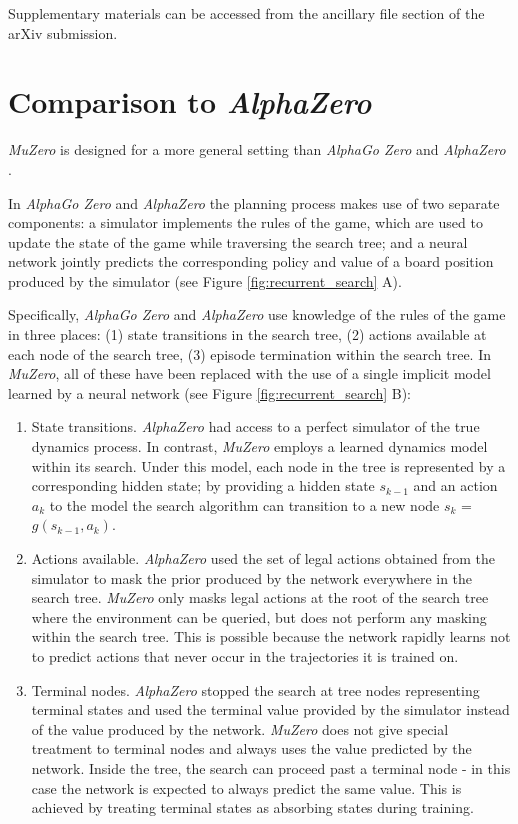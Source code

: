 \documentclass{article}
\newcommand{\muzero}{\emph{MuZero}}
\newcommand{\alphazero}{\emph{AlphaZero}}
\newcommand{\alphagozero}{\emph{AlphaGo Zero}}
\begin{document}
Supplementary materials can be accessed from the ancillary file section of the arXiv submission.

\begin{appendices}
\label{methods}


\section{Comparison to \alphazero}

\muzero{} is designed for a more general setting than  \alphagozero{} \cite{Silver17AG0} and \alphazero{} \cite{Silver18AZ}.

In \alphagozero{}  and \alphazero{} the planning process makes use of two separate components: a simulator implements the rules of the game, which are used to update the state of the game while traversing the search tree; and a neural network jointly predicts the corresponding policy and value of a board position produced by the simulator (see Figure \ref{fig:recurrent_search} A).

Specifically, \alphagozero{} and \alphazero{} use knowledge of the rules of the game in three places: (1) state transitions in the search tree, (2) actions available at each node of the search tree, (3) episode termination within the search tree.  In \muzero{}, all of these have been replaced with the use of a single implicit model learned by a neural network (see Figure \ref{fig:recurrent_search} B):

\begin{enumerate}[1)]
\item State transitions. \alphazero{} had access to a perfect simulator of the true dynamics process. In contrast, \muzero{} employs a learned dynamics model within its search. Under this model, each node in the tree is represented by a corresponding hidden state; by providing a hidden state $s_{k-1}$ and an action $a_k$ to the model the search algorithm can transition to a new node $s_{k}$ = $g(s_{k-1}, a_k)$.
\item Actions available. \alphazero{} used the set of legal actions obtained from the simulator to mask the prior produced by the network everywhere in the search tree. \muzero{} only masks legal actions at the root of the search tree where the environment can be queried, but does not perform any masking within the search tree. This is possible because the network rapidly learns not to predict actions that never occur in the trajectories it is trained on.
\item Terminal nodes. \alphazero{} stopped the search at tree nodes representing terminal states and used the terminal value provided by the simulator instead of the value produced by the network. \muzero{} does not give special treatment to terminal nodes and always uses the value predicted by the network. Inside the tree, the search can proceed past a terminal node - in this case the network is expected to always predict the same value. This is achieved by treating terminal states as absorbing states during training.
\end{enumerate}


\end{appendices}
\end{document}
